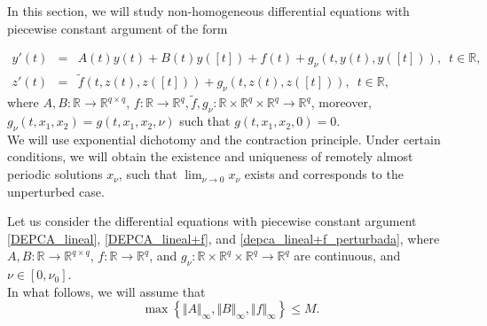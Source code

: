 \documentclass[english,,reqno]{amsart}
\numberwithin{equation}{section}
\theoremstyle{plain}
\theoremstyle{definition}
\theoremstyle{remark}
\begin{document}
In this section, we will study non-homogeneous differential equations with piecewise constant argument of the form


\begin{eqnarray}
y'\left(t\right)&=&A\left(t\right)y\left(t\right)+B\left(t\right)y\left(\left[t\right]\right)+f\left(t\right)+ g_{\nu}\left(t,y\left(t\right),y\left(\left[t\right]\right)\right),\,\,\, t\in\mathbb{R},\label{depca_lineal+f_perturbada}\\
z'\left(t\right)&=&\widetilde{f}\left(t,z\left(t\right),z\left(\left[t\right]\right)\right)+ g_{\nu}\left(t,z\left(t\right),z\left(\left[t\right]\right)\right),\,\,\, t\in\mathbb{R},\label{depca_nolineal_perturbada}
\end{eqnarray}
where $A,B:\mathbb{R}\rightarrow\mathbb{R}^{q\times q}$, $f:\mathbb{R}\rightarrow\mathbb{R}^{q}$,$\,\tilde{f},g_{\nu}:\mathbb{R}\times\mathbb{R}^{q}\times\mathbb{R}^{q}\rightarrow\mathbb{R}^{q}$, moreover, $g_\nu(t, x_1, x_2) = g(t, x_1, x_2, \nu)$ such that $g(t, x_1, x_2, 0) = 0$. \\  
We will use exponential dichotomy and the contraction principle.  
Under certain conditions, we will obtain the existence and uniqueness of remotely almost periodic solutions $x_\nu$,  
such that $\lim_{\nu \rightarrow 0} x_\nu$ exists and corresponds to the unperturbed case.


Let us consider the differential equations with piecewise constant argument \eqref{DEPCA_lineal}, \eqref{DEPCA_lineal+f}, and \eqref{depca_lineal+f_perturbada},  
where $A, B : \mathbb{R} \rightarrow \mathbb{R}^{q \times q}$, $f : \mathbb{R} \rightarrow \mathbb{R}^q$, and $g_\nu : \mathbb{R} \times \mathbb{R}^q \times \mathbb{R}^q \rightarrow \mathbb{R}^q$  
are continuous, and $\nu \in [0, \nu_0]$. \\  
In what follows, we will assume that  
\[
\max \left\{ \Vert A \Vert_{\infty}, \Vert B \Vert_{\infty}, \Vert f \Vert_{\infty} \right\} \leq M.
\]
\end{document}
